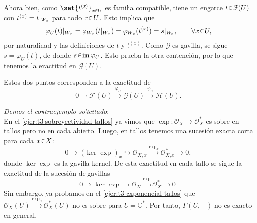 \begin{sol}
Ahora bien, como $\set{t^{(x)}}_{x\en U}$ es familia compatible, tiene un engarce $t\en\mathcal F(U)$ con $t^{(x)}=\restr{t}{W_x}$ para todo $x\en U$. Esto implica que
\[
\restr{\varphi_U(t)}{W_x}
=\varphi_{W_x}(\restr{t}{W_x})
=\varphi_{W_x}(t^{(x)})=\restr{s}{W_x},\qquad\forall x\en U,
\]
por naturalidad y las definiciones de $t$ y $t^{(x)}$. Como $\mathcal G$ es gavilla, se sigue $s=\varphi_U(t)$, de donde $s\en\im\varphi_U$. Esto prueba la otra contención, por lo que tenemos la exactitud en $\mathcal G(U)$.

Estos dos puntos corresponden a la exactitud de
\[
0\longrightarrow\mathcal F(U)\xrightarrow{\varphi_U}\mathcal G(U)\xrightarrow{\psi_U}\mathcal H(U).
\]

\medskip
\noindent\emph{Demos el contraejemplo solicitado}:\\
En el \cref{ejer:t3-sobreyectividad-tallos} ya vimos que $\exp\colon\mathcal O_X\to\mathcal O_X^*$ es sobre en tallos pero no en cada abierto. Luego, en tallos tenemos una sucesión exacta corta para cada $x\en X$:
\[
0\longrightarrow(\ker\exp)_x\hookrightarrow\mathcal O_{X,x}
\xrightarrow{\exp_x}\mathcal O_{X,x}^*\longrightarrow0,
\]
donde $\ker\exp$ es la gavilla kernel. De esta exactitud en cada tallo se sigue la exactitud de la sucesión de gavillas
\[
0\longrightarrow\ker\exp\longrightarrow\mathcal O_X\xrightarrow{\exp}\mathcal O_X^*\longrightarrow0.
\]
Sin embargo, ya probamos en el \cref{ejer:t3-exponencial-tallos} que $\mathcal O_X(U)\xrightarrow{\exp_U}\mathcal O_X^*(U)$ no es sobre para $U=\mathbb C^*$. Por tanto, $\Gamma(U,-)$ no es exacto en general.
\end{sol}
